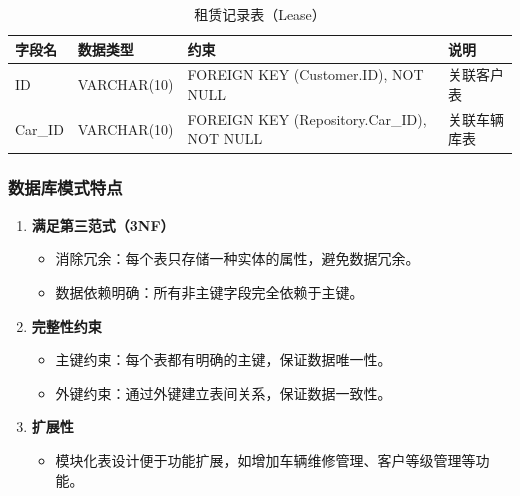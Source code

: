 \documentclass[UTF8,a4paper,12pt]{ctexart}
\begin{document}
\begin{table}[h!]
    \centering
    \caption{租赁记录表（Lease）}
\begin{tabular}{|l|l|l|l|}
\hline
字段名 & 数据类型 & 约束 & 说明 \\
\hline
ID & VARCHAR(10) & FOREIGN KEY (Customer.ID), NOT NULL & 关联客户表 \\
\hline
Car\_ID & VARCHAR(10) & FOREIGN KEY (Repository.Car\_ID), NOT NULL & 关联车辆库表 \\
\hline
\end{tabular}
\end{table}

\subsubsection{数据库模式特点}

\begin{enumerate}
    \item \textbf{满足第三范式（3NF）}
    \begin{itemize}
        \item 消除冗余：每个表只存储一种实体的属性，避免数据冗余。
        \item 数据依赖明确：所有非主键字段完全依赖于主键。
    \end{itemize}
    \item \textbf{完整性约束}
    \begin{itemize}
        \item 主键约束：每个表都有明确的主键，保证数据唯一性。
        \item 外键约束：通过外键建立表间关系，保证数据一致性。
    \end{itemize}
    \item \textbf{扩展性}
    \begin{itemize}
        \item 模块化表设计便于功能扩展，如增加车辆维修管理、客户等级管理等功能。
    \end{itemize}
\end{enumerate}

\end{document}
